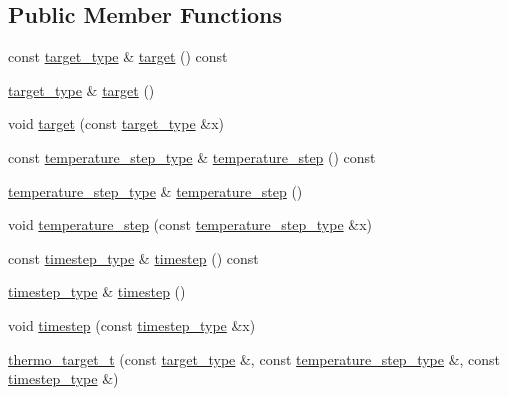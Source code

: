 \subsection*{Public Member Functions}
\begin{DoxyCompactItemize}
\item 
const \hyperlink{classthermo__target__t_af968c613cbe6e33fcd41b038cefe1f0a}{target\+\_\+type} \& \hyperlink{classthermo__target__t_a628672966d5ead6bc71493e55c34cbb3}{target} () const 
\item 
\hyperlink{classthermo__target__t_af968c613cbe6e33fcd41b038cefe1f0a}{target\+\_\+type} \& \hyperlink{classthermo__target__t_abe08ab311899de79dcd5a8b8fb428633}{target} ()
\item 
void \hyperlink{classthermo__target__t_aece45034721555ad13b977472d99bceb}{target} (const \hyperlink{classthermo__target__t_af968c613cbe6e33fcd41b038cefe1f0a}{target\+\_\+type} \&x)
\item 
const \hyperlink{classthermo__target__t_a55faae5a0c7af8d0e9567600150603b3}{temperature\+\_\+step\+\_\+type} \& \hyperlink{classthermo__target__t_a134cfd51fcc648b9b9c1f57da9d1e262}{temperature\+\_\+step} () const 
\item 
\hyperlink{classthermo__target__t_a55faae5a0c7af8d0e9567600150603b3}{temperature\+\_\+step\+\_\+type} \& \hyperlink{classthermo__target__t_a382ec9ab3ebcdb72d29d67041c78f714}{temperature\+\_\+step} ()
\item 
void \hyperlink{classthermo__target__t_a8b616af6e45e4c9f7c46ca968b1ffe88}{temperature\+\_\+step} (const \hyperlink{classthermo__target__t_a55faae5a0c7af8d0e9567600150603b3}{temperature\+\_\+step\+\_\+type} \&x)
\item 
const \hyperlink{classthermo__target__t_a37e1805b2e121c0e0b0a97b2f5d1dfcb}{timestep\+\_\+type} \& \hyperlink{classthermo__target__t_ab10e13a5b5afda48390aacee846957f7}{timestep} () const 
\item 
\hyperlink{classthermo__target__t_a37e1805b2e121c0e0b0a97b2f5d1dfcb}{timestep\+\_\+type} \& \hyperlink{classthermo__target__t_a489192ff6e44baf14178314b51805c52}{timestep} ()
\item 
void \hyperlink{classthermo__target__t_ad59c4e3d249181e5ddf18eb1c7fab5c0}{timestep} (const \hyperlink{classthermo__target__t_a37e1805b2e121c0e0b0a97b2f5d1dfcb}{timestep\+\_\+type} \&x)
\item 
\hyperlink{classthermo__target__t_a11b7af954c7b09a69d0edd1d44be7828}{thermo\+\_\+target\+\_\+t} (const \hyperlink{classthermo__target__t_af968c613cbe6e33fcd41b038cefe1f0a}{target\+\_\+type} \&, const \hyperlink{classthermo__target__t_a55faae5a0c7af8d0e9567600150603b3}{temperature\+\_\+step\+\_\+type} \&, const \hyperlink{classthermo__target__t_a37e1805b2e121c0e0b0a97b2f5d1dfcb}{timestep\+\_\+type} \&)

\end{DoxyCompactItemize}
